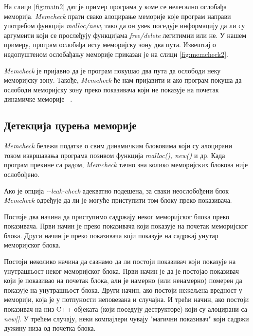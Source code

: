 \documentclass[12pt,oneside]{memoir}
\begin{document}
\indent На слици \ref{fig:main2} дат је пример програма у коме се нелегално ослобађа меморија. \textit{Memcheck} прати свако алоцирање меморије које програм направи употребом функција \textit{malloc/new}, тако да он увек поседује информацију да ли су аргументи који се прослеђују функцијама \textit{free/delete} легитимни или не. У нашем примеру, програм ослобађа исту меморијску зону два пута. Извештај о недопуштеном ослобађању меморије приказан је на слици \ref{fig:memcheck2}.

\indent \textit{Memcheck} је пријавио да је програм покушао два пута да ослободи неку меморијску зону.  Такође, \textit{Memcheck} ће нам пријавити и ако програм покуша да ослободи меморијску зону преко показивача који не показује на почетак динамичке меморије ~\cite{memcheckRef}.

\subsection{Детекција цурења меморије}

\indent \textit{Memcheck} бележи податке о свим динамичким блоковима који су алоцирани током извршавања програма позивом функција \textit{malloc(), new()} и др. Када програм прекине са радом, \textit{Memcheck} тачно зна колико меморијских блокова није ослобођено.

\indent Ако је опција \textit{-\--leak-check} адекватно подешена, за сваки неослобођени блок \textit{Memcheck} одређује да ли је могуће приступити том блоку преко показивача.

\indent Постоје два начина да приступимо садржају неког меморијског блока преко показивача. Први начин је преко показивача који показује на почетак меморијског блока. Други начин је преко показивача који показује на садржај унутар меморијског блока.

\indent Постоји неколико начина да сазнамо да ли постоји показивач који показује на унутрашњост неког меморијског блока. Први начин је да је постојао показивач који је показивао на почетак блока, али је намерно (или ненамерно) померен да показује на унутрашњост блока. Други начин, ако постоји нежељена вредност у меморији, која је у потпуности неповезана и случајна. И трећи начин, ако постоји показивач на низ C++ објеката (који поседују деструкторе) који су алоцирани са \textit{new[]}. У трећем случају, неки компајлери чувају "магични показивач" који садржи дужину низа од почетка блока.
\end{document}
